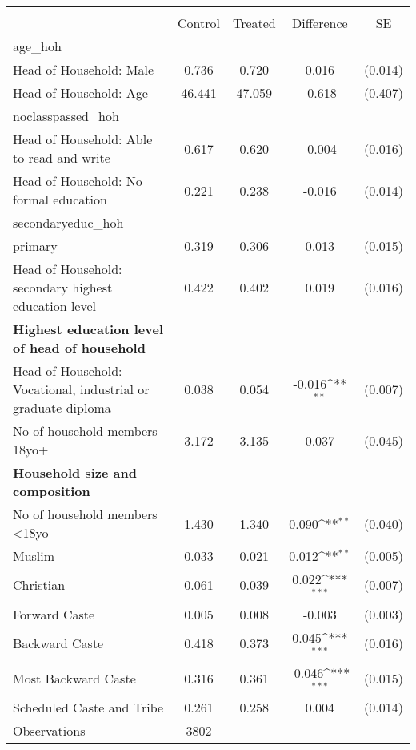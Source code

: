 {
\def\sym#1{\ifmmode^{#1}\else\(^{#1}\)\fi}
\begin{tabular}{l*{1}{cccc}}
\hline\hline
                    &\multicolumn{4}{c}{}                                        \\
                    &     Control&     Treated&  Difference         &          SE\\
\hline
age\_hoh             &            &            &                     &            \\
Head of Household: Male&       0.736&       0.720&       0.016         &     (0.014)\\
Head of Household: Age&      46.441&      47.059&      -0.618         &     (0.407)\\
noclasspassed\_hoh   &            &            &                     &            \\
Head of Household: Able to read and write&       0.617&       0.620&      -0.004         &     (0.016)\\
Head of Household: No formal education&       0.221&       0.238&      -0.016         &     (0.014)\\
secondaryeduc\_hoh   &            &            &                     &            \\
primary             &       0.319&       0.306&       0.013         &     (0.015)\\
Head of Household: secondary highest education level&       0.422&       0.402&       0.019         &     (0.016)\\
\textbf{Highest education level of head of household}&            &            &                     &            \\
Head of Household: Vocational, industrial or graduate diploma&       0.038&       0.054&      -0.016\sym{**} &     (0.007)\\
No of household members 18yo+&       3.172&       3.135&       0.037         &     (0.045)\\
\textbf{Household size and composition}&            &            &                     &            \\
No of household members <18yo&       1.430&       1.340&       0.090\sym{**} &     (0.040)\\
Muslim              &       0.033&       0.021&       0.012\sym{**} &     (0.005)\\
Christian           &       0.061&       0.039&       0.022\sym{***}&     (0.007)\\
Forward Caste       &       0.005&       0.008&      -0.003         &     (0.003)\\
Backward Caste      &       0.418&       0.373&       0.045\sym{***}&     (0.016)\\
Most Backward Caste &       0.316&       0.361&      -0.046\sym{***}&     (0.015)\\
Scheduled Caste and Tribe&       0.261&       0.258&       0.004         &     (0.014)\\
\hline
Observations        &        3802&            &                     &            \\
\hline\hline
\end{tabular}
}
